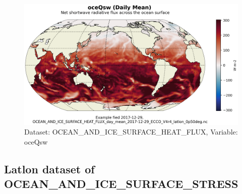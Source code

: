 \begin{figure}[H]
\centering
\includegraphics[scale=0.55]{../images/plots/latlon_plots/Ocean_and_Sea-Ice_Surface_Heat_Fluxes/oceQsw.png}
\caption{Dataset: OCEAN\_AND\_ICE\_SURFACE\_HEAT\_FLUX, Variable: oceQsw}
\label{tab:table-OCEAN_AND_ICE_SURFACE_HEAT_FLUX_oceQsw-Plot}
\end{figure}
\subsection{Latlon dataset of OCEAN\_AND\_ICE\_SURFACE\_STRESS}
\newp
